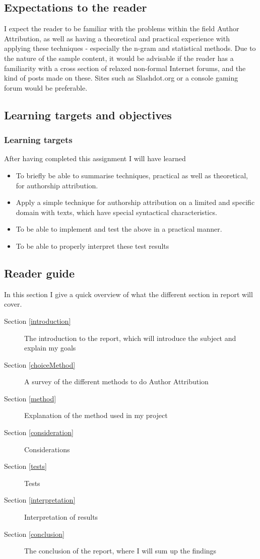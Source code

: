 \subsection{Expectations to the reader}
\label{expectations}
I expect the reader to be familiar with the problems within the field Author Attribution, as well as having a theoretical and practical experience with applying these techniques - especially the n-gram and statistical methods. Due to the nature of the sample content, it would be advisable if the reader has a familiarity with a cross section of relaxed non-formal Internet forums, and the kind of posts made on these. Sites such as Slashdot.org or a console gaming forum would be preferable.

\subsection{Learning targets and objectives}
\label{learning}
\subsubsection{Learning targets}
After having completed this assignment I will have learned 
\begin{itemize}
\item To briefly be able to summarise techniques, practical as well as theoretical, for authorship attribution.
\item Apply a simple technique for authorship attribution on a limited and specific domain with texts, which have special syntactical characteristics.
\item To be able to implement and test the above in a practical manner.
\item To be able to properly interpret these test results
\end{itemize}

\subsection{Reader guide}
In this section I give a quick overview of what the different section in report will cover.
\begin{description}
\item[Section \ref{introduction}] The introduction to the report, which will introduce the subject and explain my goals
\item[Section \ref{choiceMethod}] A survey of the different methods to do Author Attribution  
\item[Section \ref{method}] Explanation of the method used in my project
\item[Section \ref{consideration}] Considerations 
\item[Section \ref{tests}] Tests
\item[Section \ref{interpretation}] Interpretation of results
\item[Section \ref{conclusion}] The conclusion of the report, where I will sum up the findings  
\end{description}

